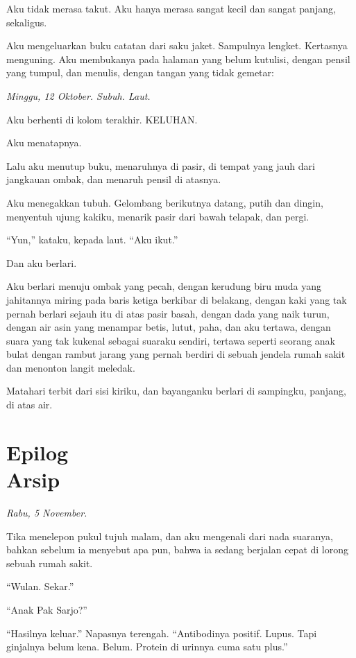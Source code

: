 \documentclass[11pt,twoside,openany]{book}
\begin{document}
Aku tidak merasa takut. Aku hanya merasa sangat kecil dan sangat panjang, sekaligus.

Aku mengeluarkan buku catatan dari saku jaket. Sampulnya lengket. Kertasnya menguning. Aku membukanya pada halaman yang belum kutulisi, dengan pensil yang tumpul, dan menulis, dengan tangan yang tidak gemetar:

\emph{Minggu, 12 Oktober. Subuh. Laut.}

Aku berhenti di kolom terakhir. KELUHAN.

Aku menatapnya.

Lalu aku menutup buku, menaruhnya di pasir, di tempat yang jauh dari jangkauan ombak, dan menaruh pensil di atasnya.

Aku menegakkan tubuh. Gelombang berikutnya datang, putih dan dingin, menyentuh ujung kakiku, menarik pasir dari bawah telapak, dan pergi.

``Yun,'' kataku, kepada laut. ``Aku ikut.''

Dan aku berlari.

Aku berlari menuju ombak yang pecah, dengan kerudung biru muda yang jahitannya miring pada baris ketiga berkibar di belakang, dengan kaki yang tak pernah berlari sejauh itu di atas pasir basah, dengan dada yang naik turun, dengan air asin yang menampar betis, lutut, paha, dan aku tertawa, dengan suara yang tak kukenal sebagai suaraku sendiri, tertawa seperti seorang anak bulat dengan rambut jarang yang pernah berdiri di sebuah jendela rumah sakit dan menonton langit meledak.

Matahari terbit dari sisi kiriku, dan bayanganku berlari di sampingku, panjang, di atas air.

\chapter*{Epilog\\[0.5em]\normalsize\upshape Arsip}
\emph{Rabu, 5 November.}

Tika menelepon pukul tujuh malam, dan aku mengenali dari nada suaranya, bahkan sebelum ia menyebut apa pun, bahwa ia sedang berjalan cepat di lorong sebuah rumah sakit.

``Wulan. Sekar.''

``Anak Pak Sarjo?''

``Hasilnya keluar.'' Napasnya terengah. ``Antibodinya positif. Lupus. Tapi ginjalnya belum kena. Belum. Protein di urinnya cuma satu plus.''
\end{document}

